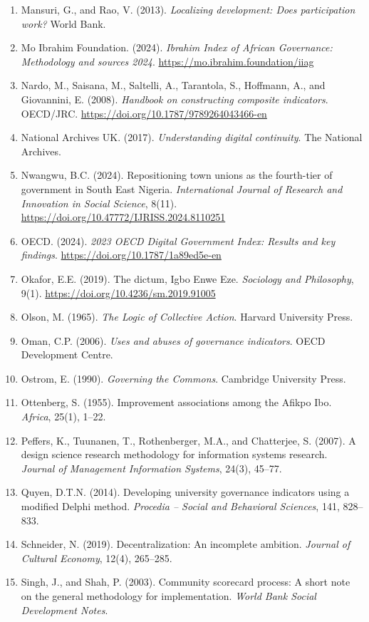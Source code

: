 \documentclass[sigconf,anonymous]{acmart}
\begin{document}
{\begin{enumerate}
\item Mansuri, G., and Rao, V. (2013). \textit{Localizing development: Does participation work?} World Bank.
\item Mo Ibrahim Foundation. (2024). \textit{Ibrahim Index of African Governance: Methodology and sources 2024}. \url{https://mo.ibrahim.foundation/iiag}
\item Nardo, M., Saisana, M., Saltelli, A., Tarantola, S., Hoffmann, A., and Giovannini, E. (2008). \textit{Handbook on constructing composite indicators}. OECD/JRC. \url{https://doi.org/10.1787/9789264043466-en}
\item National Archives UK. (2017). \textit{Understanding digital continuity}. The National Archives.
\item Nwangwu, B.C. (2024). Repositioning town unions as the fourth-tier of government in South East Nigeria. \textit{International Journal of Research and Innovation in Social Science}, 8(11). \url{https://doi.org/10.47772/IJRISS.2024.8110251}
\item OECD. (2024). \textit{2023 OECD Digital Government Index: Results and key findings}. \url{https://doi.org/10.1787/1a89ed5e-en}
\item Okafor, E.E. (2019). The dictum, Igbo Enwe Eze. \textit{Sociology and Philosophy}, 9(1). \url{https://doi.org/10.4236/sm.2019.91005}
\item Olson, M. (1965). \textit{The Logic of Collective Action}. Harvard University Press.
\item Oman, C.P. (2006). \textit{Uses and abuses of governance indicators}. OECD Development Centre.
\item Ostrom, E. (1990). \textit{Governing the Commons}. Cambridge University Press.
\item Ottenberg, S. (1955). Improvement associations among the Afikpo Ibo. \textit{Africa}, 25(1), 1--22.
\item Peffers, K., Tuunanen, T., Rothenberger, M.A., and Chatterjee, S. (2007). A design science research methodology for information systems research. \textit{Journal of Management Information Systems}, 24(3), 45--77.
\item Quyen, D.T.N. (2014). Developing university governance indicators using a modified Delphi method. \textit{Procedia -- Social and Behavioral Sciences}, 141, 828--833.
\item Schneider, N. (2019). Decentralization: An incomplete ambition. \textit{Journal of Cultural Economy}, 12(4), 265--285.
\item Singh, J., and Shah, P. (2003). Community scorecard process: A short note on the general methodology for implementation. \textit{World Bank Social Development Notes}.

\end{enumerate}}
\end{document}
